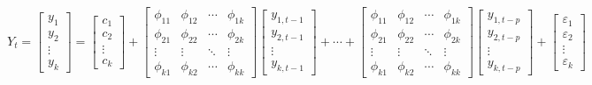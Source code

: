 \documentclass{ieeeojies}
\begin{document}
\begin{dmath*}
    Y_t=\begin{bmatrix}
        y_1 \\ y_2 \\ \vdots \\ y_k
    \end{bmatrix}
    = \begin{bmatrix}
        c_1 \\ c_2 \\ \vdots \\ c_k
    \end{bmatrix}
    + \begin{bmatrix}
        \phi_{11} & \phi_{12} & \cdots & \phi_{1k} \\
        \phi_{21} & \phi_{22} & \cdots & \phi_{2k} \\
        \vdots    & \vdots    & \ddots & \vdots    \\
        \phi_{k1} & \phi_{k2} & \cdots & \phi_{kk}
    \end{bmatrix}
    \begin{bmatrix}
        y_{1,t-1} \\ y_{2,t-1} \\ \vdots \\ y_{k,t-1}
    \end{bmatrix}
    + \cdots
    + \begin{bmatrix}
        \phi_{11} & \phi_{12} & \cdots & \phi_{1k} \\
        \phi_{21} & \phi_{22} & \cdots & \phi_{2k} \\
        \vdots    & \vdots    & \ddots & \vdots    \\
        \phi_{k1} & \phi_{k2} & \cdots & \phi_{kk}
    \end{bmatrix}
    \begin{bmatrix}
        y_{1,t-p} \\ y_{2,t-p} \\ \vdots \\ y_{k,t-p}
    \end{bmatrix}
    + \begin{bmatrix}
        \varepsilon_1 \\ \varepsilon_2 \\ \vdots \\ \varepsilon_k
    \end{bmatrix}
\end{dmath*}
\end{document}
